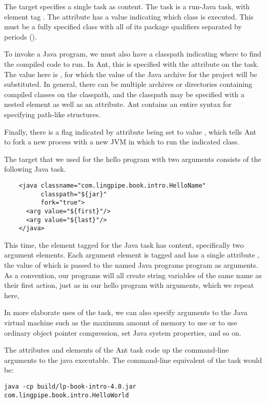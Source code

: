 The  target specifies a single task as content.  The task
is a run-Java task, with element tag .  The attribute
 has a value indicating which class is executed.  This
must be a fully specified class with all of its package qualifiers
separated by periods ().  

To invoke a Java program, we must also have a classpath indicating where
to find the compiled code to run.  In Ant, this is specified with
the  attribute on the  task.  The value here
is , for which the value of the Java archive for the
project will be substituted.  In general, there can be multiple archives
or directories containing compiled classes on the classpath, and the
classpath may be specified with a nested element as well as an attribute.
Ant contains an entire syntax for specifying path-like structures.

Finally, there is a flag indicated by attribute  being
set to value , which tells Ant to fork a new process with
a new JVM in which to run the indicated class.  

The target  that we used for the hello program with
two arguments consists of the following Java task.
%
\begin{verbatim}
    <java classname="com.lingpipe.book.intro.HelloName"
          classpath="${jar}"
          fork="true">
      <arg value="${first}"/>
      <arg value="${last}"/>
    </java>
\end{verbatim}
%
This time, the element tagged  for the Java task has
content, specifically two argument elements.  Each argument element is
tagged  and has a single attribute , the value
of which is passed to the named Java programs  program as
arguments.  As a convention, our programs will all create string
variables of the same name as their first action, just as in our
hello program with arguments, which we repeat here,
%

In more elaborate uses of the  task, we can also specify
arguments to the Java virtual machine such as the maximum amount of
memory to use or to use ordinary object pointer compression, set Java
system properties, and so on.

The attributes and elements of the Ant  task code up the
command-line arguments to the java executable.
The command-line equivalent of the  task would be:
%
\begin{verbatim}
java -cp build/lp-book-intro-4.0.jar com.lingpipe.book.intro.HelloWorld
\end{verbatim}
%

